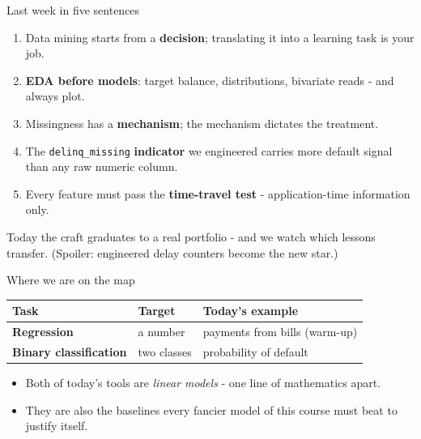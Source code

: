 \documentclass[10pt,aspectratio=169]{beamer}
\begin{document}
\begin{frame}{Last week in five sentences}
  \begin{enumerate}
    \item Data mining starts from a \textbf{decision}; translating it into a
          learning task is your job.
    \item \textbf{EDA before models}: target balance, distributions,
          bivariate reads - and always plot.
    \item Missingness has a \textbf{mechanism}; the mechanism dictates the
          treatment.
    \item The \texttt{delinq\_missing} \textbf{indicator} we engineered carries
          more default signal than any raw numeric column.
    \item Every feature must pass the \textbf{time-travel test} -
          application-time information only.
  \end{enumerate}
  \vspace{0.5em}
  \begin{center}
    Today the craft graduates to a \alert{real} portfolio - and we watch
    which lessons transfer. (Spoiler: engineered delay counters become the
    new star.)
  \end{center}
\end{frame}

\begin{frame}{Where we are on the map}
  \small
  \begin{center}
  \begin{tabular}{@{}lp{4.2cm}p{4.4cm}@{}}
    \toprule
    Task & Target & Today's example \\
    \midrule
    \textbf{Regression} & a number & payments from bills (warm-up) \\
    \textbf{Binary classification} & two classes & \alert{probability of default} \\
    \bottomrule
  \end{tabular}
  \end{center}
  \vspace{0.6em}
  \begin{itemize}\small
    \item Both of today's tools are \emph{linear models} - one line of
          mathematics apart.
    \item They are also the \alert{baselines} every fancier model of this
          course must beat to justify itself.
  \end{itemize}
\end{frame}
\end{document}
